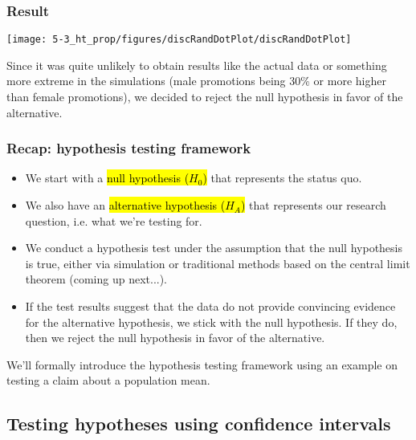 
\begin{frame}
\frametitle{Result}

\begin{center}
\texttt{[image: 5-3\_ht\_prop/figures/discRandDotPlot/discRandDotPlot]}
\end{center}

\pause

Since it was quite unlikely to obtain results like the actual data or something more extreme in the simulations (male promotions being 30\% or more higher than female promotions), we decided to reject the null hypothesis in favor of the alternative.

\end{frame}


\begin{frame}
\frametitle{Recap: hypothesis testing framework}

\begin{itemize}
\item We start with a \hl{null hypothesis ($H_0$)} that represents the status quo.
\pause
\item We also have an \hl{alternative hypothesis ($H_A$)} that represents our research question, i.e. what we're testing for.
\pause
\item We conduct a hypothesis test under the assumption that the null hypothesis is true, either via simulation or traditional methods based on the central limit theorem (coming up next...).
\pause
\item If the test results suggest that the data do not provide convincing evidence for the alternative hypothesis, we stick with the null hypothesis. If they do, then we reject the null hypothesis in favor of the alternative.
\end{itemize}
\pause
We'll formally introduce the hypothesis testing framework using an example on testing a claim about a population mean.

\end{frame}


 \subsection{Testing hypotheses using confidence intervals} 
 
